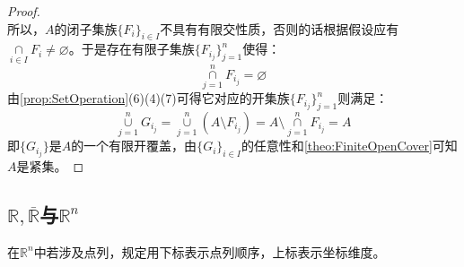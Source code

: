 \begin{proof}
\begin{equation*}
	\end{equation*}
	所以，$A$的闭子集族$\{F_i\}_{i\in I}$不具有有限交性质，否则的话根据假设应有$\underset{i\in I}{\overset{}{\cap}}F_i\ne\varnothing$。于是存在有限子集族$\{F_{i_j}\}_{j=1}^n$使得：
	\begin{equation*}
		\underset{j=1}{\overset{n}{\cap}}F_{i_j}=\varnothing
	\end{equation*}
	由\cref{prop:SetOperation}(6)(4)(7)可得它对应的开集族$\{F_{i_j}\}_{j=1}^n$则满足：
	\begin{equation*}
		\underset{j=1}{\overset{n}{\cup}}G_{i_j}=\underset{j=1}{\overset{n}{\cup}}(A\setminus F_{i_j})=A\setminus\underset{j=1}{\overset{n}{\cap}}F_{i_j}=A
	\end{equation*}
	即$\{G_{i_j}\}$是$A$的一个有限开覆盖，由$\{G_i\}_{i\in I}$的任意性和\cref{theo:FiniteOpenCover}可知$A$是紧集。
\end{proof}

\subsection{$\mathbb{R},\overline{\mathbb{R}}$与$\mathbb{R}^{n}$}
在$\mathbb{R}^{n}$中若涉及点列，规定用下标表示点列顺序，上标表示坐标维度。
